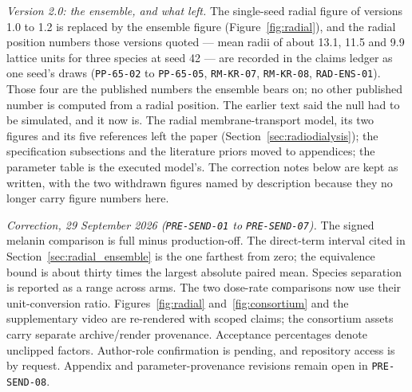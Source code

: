 \documentclass[11pt]{article}
\begin{document}
\emph{Version 2.0: the ensemble, and what left.} The single-seed radial figure of versions 1.0
to 1.2 is replaced by the ensemble figure (Figure~\ref{fig:radial}), and the radial position
numbers those versions quoted --- mean radii of about 13.1, 11.5 and 9.9 lattice units for three
species at seed 42 --- are recorded in the claims ledger as one seed's draws (\texttt{PP-65-02} to
\texttt{PP-65-05}, \texttt{RM-KR-07}, \texttt{RM-KR-08}, \texttt{RAD-ENS-01}). Those four are
the published numbers the ensemble bears on; no other published number is computed from a radial
position. The earlier text said the null had to be simulated, and it now is. The radial membrane-transport model, its two figures and its five references left the
paper (Section~\ref{sec:radiodialysis}); the specification subsections and the literature priors
moved to appendices; the parameter table is the executed model's. The correction notes below are
kept as written, with the two withdrawn figures named by description because they no longer carry
figure numbers here. \par \emph{Correction, 29 September 2026 (\texttt{PRE-SEND-01} to \texttt{PRE-SEND-07}).} The signed melanin comparison is full minus production-off. The direct-term interval cited in Section~\ref{sec:radial_ensemble} is the one farthest from zero; the equivalence bound is about thirty times the largest absolute paired mean. Species separation is reported as a range across arms. The two dose-rate comparisons now use their unit-conversion ratio. Figures~\ref{fig:radial} and~\ref{fig:consortium} and the supplementary video are re-rendered with scoped claims; the consortium assets carry separate archive/render provenance. Acceptance percentages denote unclipped factors. Author-role confirmation is pending, and repository access is by request. Appendix and parameter-provenance revisions remain open in \texttt{PRE-SEND-08}.
\end{document}
